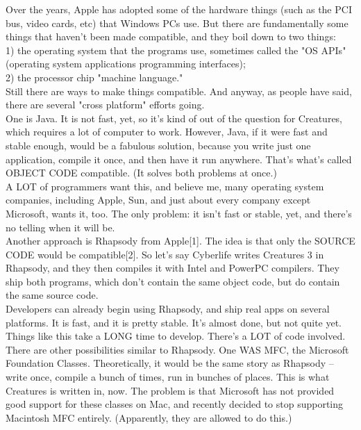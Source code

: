 \documentclass[11pt,twoside,a4paper]{article}
\begin{document}
\begin{multicols*}{2}
Over the years, Apple has adopted some of the hardware things (such as the PCI bus, video cards, etc) that Windows PCs use. But there are fundamentally some things that haven't been made compatible, and they boil down to two things:~\\
1) the operating system that the programs use, sometimes called the "OS APIs" (operating system applications programming interfaces);~\\
2) the processor chip "machine language."~\\

Still there are ways to make things compatible. And anyway, as people have said, there are several "cross platform" efforts going.~\\

One is Java. It is not fast, yet, so it's kind of out of the question for Creatures, which requires a lot of computer to work. However, Java, if it were fast and stable enough, would be a fabulous solution, because you write just one application, compile it once, and then have it run anywhere. That's what's called OBJECT CODE compatible. (It solves both problems at once.)~\\

A LOT of programmers want this, and believe me, many operating system companies, including Apple, Sun, and just about every company except Microsoft, wants it, too. The only problem: it isn't fast or stable, yet, and there's no telling when it will be.~\\

Another approach is Rhapsody from Apple[1]. The idea is that only the SOURCE CODE would be compatible[2]. So let's say Cyberlife writes Creatures 3 in Rhapsody, and they then compiles it with Intel and PowerPC compilers. They ship both programs, which don't contain the same object code, but do contain the same source code.~\\

Developers can already begin using Rhapsody, and ship real apps on several platforms. It is fast, and it is pretty stable. It's almost done, but not quite yet. Things like this take a LONG time to develop. There's a LOT of code involved.~\\

There are other possibilities similar to Rhapsody. One WAS MFC, the Microsoft Foundation Classes. Theoretically, it would be the same story as Rhapsody -- write once, compile a bunch of times, run in bunches of places. This is what Creatures is written in, now. The problem is that Microsoft has not provided good support for these classes on Mac, and recently decided to stop supporting Macintosh MFC entirely. (Apparently, they are allowed to do this.)~\\


\end{multicols*}
\end{document}

